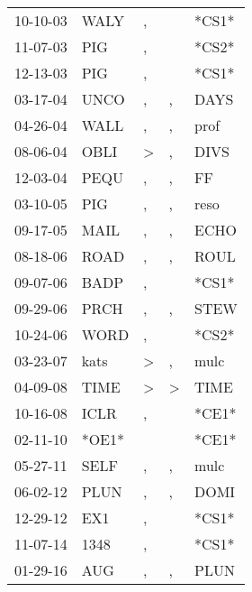\begin{supertabular}{lllll}
 10-10-03 &   WALY &             , &               &  *CS1* \\
 11-07-03 &    PIG &             , &               &  *CS2* \\
 12-13-03 &    PIG &             , &               &  *CS1* \\
 03-17-04 &   UNCO &             , &             , &   DAYS \\
 04-26-04 &   WALL &             , &             , &   prof \\
 08-06-04 &   OBLI &  \textgreater &             , &   DIVS \\
 12-03-04 &   PEQU &             , &             , &     FF \\
 03-10-05 &    PIG &             , &             , &   reso \\
 09-17-05 &   MAIL &             , &             , &   ECHO \\
 08-18-06 &   ROAD &             , &             , &   ROUL \\
 09-07-06 &   BADP &             , &               &  *CS1* \\
 09-29-06 &   PRCH &             , &             , &   STEW \\
 10-24-06 &   WORD &             , &               &  *CS2* \\
 03-23-07 &   kats &  \textgreater &             , &   mulc \\
 04-09-08 &   TIME &  \textgreater &  \textgreater &   TIME \\
 10-16-08 &   ICLR &             , &               &  *CE1* \\
 02-11-10 &  *OE1* &               &               &  *CE1* \\
 05-27-11 &   SELF &             , &             , &   mulc \\
 06-02-12 &   PLUN &             , &             , &   DOMI \\
 12-29-12 &    EX1 &             , &               &  *CS1* \\
 11-07-14 &   1348 &             , &               &  *CS1* \\
 01-29-16 &    AUG &             , &             , &   PLUN \\
\end{supertabular}
